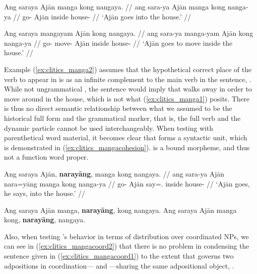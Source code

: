 \pex\label{ex:clitics_manga}
\a\label{ex:clitics_manga1}\begingl
	\gla Ang saraya Ajān manga kong nangaya. //
	\glb ang sara-ya Ajān manga kong nanga-ya //
	\glc \AgtT{} go-\TsgM{} Ajān \Dyn{} inside house-\Loc{} //
	\glft `Ajān goes into the house.' //
\endgl

\a\label{ex:clitics_manga2}\ljudge{\excl}\begingl
\gla Ang saraya mangayam Ajān kong nangaya. //
	\glb ang sara-ya manga-yam Ajān kong nanga-ya //
	\glc \AgtT{} go-\TsgM{} move-\Ptcp{} Ajān inside house-\Loc{} //
	\glft `Ajān goes to move inside the house.' //
\endgl
\xe

Example (\ref{ex:clitics_manga2}) assumes that the hypothetical correct place
of the verb  to appear in is as an infinite complement
to the main verb in the sentence, . While not
ungrammatical , the sentence would imply that 
walks away in order to move around in the house, which is not what
(\ref{ex:clitics_manga1}) posits. There is thus no direct semantic relationship
between what we assumed to be the historical full form and the grammatical
marker, that is, the full verb and the dynamic particle cannot be used
interchangeably. When testing with parenthetical word material, it becomes
clear that  forms a syntactic unit, which is
demonstrated in (\ref{ex:clitics_mangacohesion}).  is a bound
morpheme, and thus not a function word proper.

\pex\label{ex:clitics_mangacohesion}
\a\label{ex:clitics_mangacohesion1}\begingl
	\gla Ang saraya Ajān, \textbf{narayāng}, manga kong nangaya. //
	\glb ang sara-ya Ajān nara=yāng manga kong nanga-ya //
	\glc \AgtT{} go-\TsgM{} Ajān say=\TsgM{}.\Aarg{} \Dyn{} inside 
		house-\Loc{} //
	\glft `Ajān goes, he says, into the house.' //
\endgl

\a\label{ex:clitics_mangacohesion2}
	\ljudge{*} Ang saraya Ajān manga, \textbf{narayāng}, kong nangaya.
\a\label{ex:clitics_mangacohesion3}
	Ang saraya Ajān manga kong, \textbf{narayāng}, nangaya.
\xe

Also, when testing 's behavior in terms of distribution over
coordinated NPs, we can see in (\ref{ex:clitics_mangacoord2}) that there is no
problem in condensing the sentence given in (\ref{ex:clitics_mangacoord1}) to
the extent that  governs two adpositions in
coordination--- and
---sharing the same adpositional object,
.


